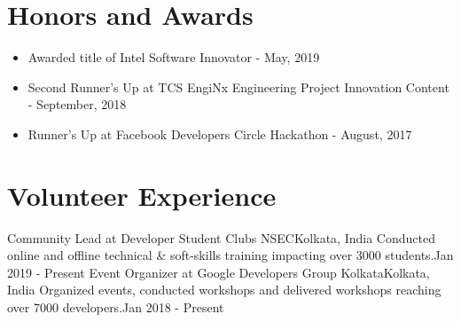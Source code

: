 \section{Honors and Awards}
\begin{itemize}
\item {Awarded title of Intel Software Innovator - May, 2019}
\item {Second Runner's Up at TCS EngiNx Engineering Project Innovation Content - September, 2018 }
\item {Runner's Up at Facebook Developers Circle Hackathon - August, 2017}
\end{itemize}

\vspace{-5pt}
\section{Volunteer Experience}
  \resumeSubHeadingListStart
	\resumeSubheading
    {Community Lead at Developer Student Clubs NSEC}{Kolkata, India}
    {Conducted online and offline technical \& soft-skills training impacting over 3000 students.}{Jan 2019 - Present}
\vspace{5pt}
    \resumeSubheading
    {Event Organizer at Google Developers Group Kolkata}{Kolkata, India}
    {Organized events, conducted workshops and delivered workshops reaching over 7000 developers.}{Jan 2018 - Present}

\resumeSubHeadingListEnd

